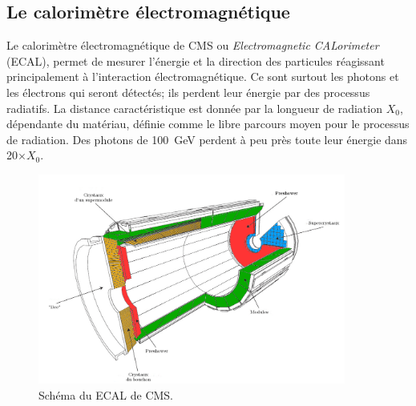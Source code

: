 \newpage
\subsection{Le calorimètre électromagnétique}
Le calorimètre électromagnétique de CMS ou \textit{Electromagnetic CALorimeter} (ECAL), permet de mesurer l'énergie et la direction des particules réagissant principalement à l'interaction électromagnétique. Ce sont surtout les photons et les électrons qui seront détectés; ils perdent leur énergie par des processus radiatifs. La distance caractéristique est donnée par la longueur de radiation $X_{0}$, dépendante du matériau, définie comme le libre parcours moyen pour le processus de radiation. Des photons de \SI{100}{\giga\eV} perdent à peu près toute leur énergie dans \num{20}$\times X_{0}$.
\begin{figure}[ht!]
	\centering
	\includegraphics[width=0.90\textwidth]{CMS/ECAL.png}
	\captionsetup{type=figure}\caption{Schéma du ECAL de CMS.}
	\label{ECAL}
\end{figure}

